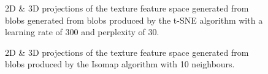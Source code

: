 \clearpage
\begin{figure}[H]
	\centering
	\caption{2D \& 3D projections of the texture feature space generated from blobs generated from blobs produced by the t-SNE algorithm with a learning rate of 300 and perplexity of 30.}\label{fig:texture_SNE_mapping}
\end{figure}

\begin{figure}[H]
	\centering
	\caption{2D \& 3D projections of the texture feature space generated from blobs produced by the Isomap algorithm with 10 neighbours.}\label{fig:texture_iso_mapping}
\end{figure}


